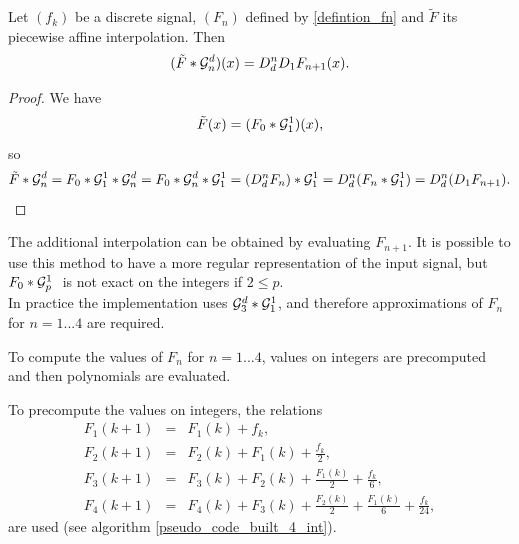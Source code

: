 


\begin{prop}
Let $(f_k)$ be a discrete signal, $(F_n)$ defined by \eqref{defintion_fn} and $\tilde F$ its piecewise affine interpolation. Then
\begin{equation*}
( \tilde{F} * \mathcal{G}_n^d ) (x) = D_d^{n}D_1 F_{n+1}(x).
\end{equation*}
\end{prop}

\begin{proof}
We have
\begin{equation*}
\tilde{F}(x)=(F_{0} * \mathcal{G}_1^1 )(x),
\end{equation*}
so
\begin{equation*}
\tilde{F}*\mathcal{G}_n^d=F_{0}*\mathcal{G}_1^1*\mathcal{G}_n^d=F_{0}*\mathcal{G}_n^d*\mathcal{G}_1^1=(D_d^n F_{n})*\mathcal{G}_1^1=D_d^n (F_{n}*\mathcal{G}_1^1)= D_d^n (D_1 F_{n+1}).
\end{equation*}
\end{proof}


The additional interpolation can be obtained by evaluating $F_{n+1}$.
It is possible to use this method to have a more regular representation of the input signal, but $F_0 * \mathcal{G}_p^1~$ is not exact on the integers if $2\le p$.\\
In practice the implementation uses $\mathcal{G}_3^d * \mathcal{G}_1^1$, and therefore approximations of $F_n$ for $n=1...4$ are required.



To compute the values of $F_n$ for $n=1...4$, values on integers are precomputed and then polynomials are evaluated.


To precompute the values on integers, the relations
\begin{eqnarray}
F_{1}(k+1)&=&  F_{1}(k)+f_{k}, \label{formula_discret_integral_1}\\
F_{2}(k+1)&=&  F_{2}(k)+F_{1}(k)+\frac{f_{k}}{2}, \label{formula_discret_integral_2}\\
F_{3}(k+1)&=&  F_{3}(k)+F_{2}(k)+\frac{F_{1}(k)}{2}+\frac{f_{k}}{6}, \label{formula_discret_integral_3}\\
F_{4}(k+1)&=&  F_{4}(k)+F_{3}(k)+\frac{F_{2}(k)}{2}+\frac{F_{1}(k)}{6}+\frac{f_{k}}{24}, \label{formula_discret_integral_4}
\end{eqnarray}
are used (see algorithm \ref{pseudo_code_built_4_int}).


